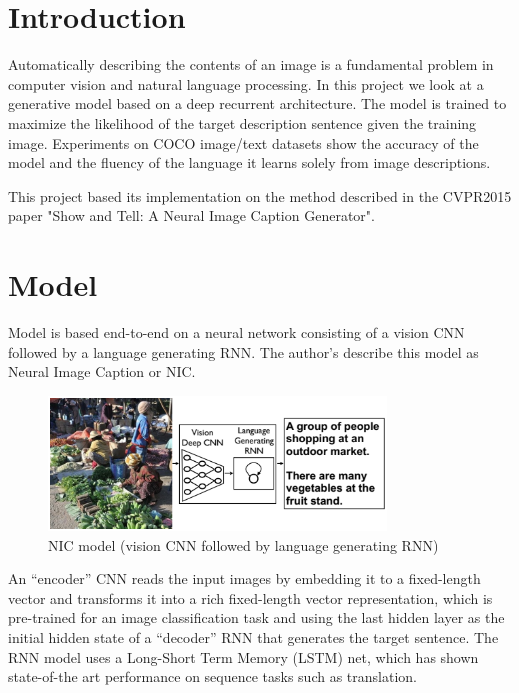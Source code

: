 \section{Introduction}
Automatically describing the contents of an image is a fundamental problem in computer vision and natural language processing. In this project we look at a generative model based on a deep recurrent architecture. The model is trained to maximize the likelihood of the target description sentence given the training image. Experiments on COCO image/text datasets show the accuracy of the model and the fluency of the language it learns solely from image descriptions.

This project based its implementation on the method described in the CVPR2015 paper "Show and Tell: A Neural Image Caption Generator". 

\section{Model}
Model is based end-to-end on a neural network consisting of a vision CNN followed by a language generating RNN. The author's describe this model as Neural Image Caption or NIC.
\begin{figure}[ht!]
\centering
\includegraphics[width=0.8\textwidth]{assets/shownntell.png}
\caption{\label{fig:shownntell}NIC model (vision CNN followed by language generating RNN)}
\end{figure}

An “encoder” CNN reads the input images by embedding it to a fixed-length vector and transforms it into a rich fixed-length vector representation, which is pre-trained for an image classification task and using the last hidden layer as the initial hidden state of a “decoder” RNN that generates the target sentence. The RNN model uses a Long-Short Term Memory (LSTM) net, which has shown state-of-the art performance on sequence tasks such as translation.

